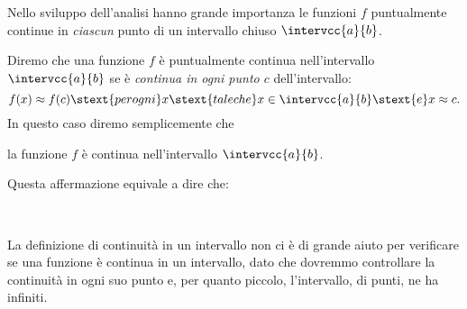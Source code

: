 Nello sviluppo dell'analisi hanno grande importanza le funzioni 
\(f\) puntualmente continue in \emph{ciascun} punto di un intervallo chiuso 
\(\intervcc{a}{b}\).

Diremo che una funzione \(f\) è puntualmente continua nell'intervallo 
\(\intervcc{a}{b}\) se è \emph{continua in ogni punto \(c\)} dell'intervallo:
\[f(x) \approx f(c) \stext{per ogni} x \stext{tale che} 
x \in \intervcc{a}{b} \stext{e} x \approx c.\] 
In questo caso diremo semplicemente che 
\begin{center}
la funzione \(f\) è continua nell'intervallo \(\intervcc{a}{b}\). 
\end{center}
Questa affermazione equivale a dire che:

 
\begin{esempio}
~

\end{esempio}

La definizione di continuità in un intervallo non ci è di grande aiuto per 
verificare se una funzione è continua in un intervallo, dato che dovremmo 
controllare la continuità in ogni suo punto e, per quanto piccolo, 
l'intervallo, di punti, ne ha infiniti.

